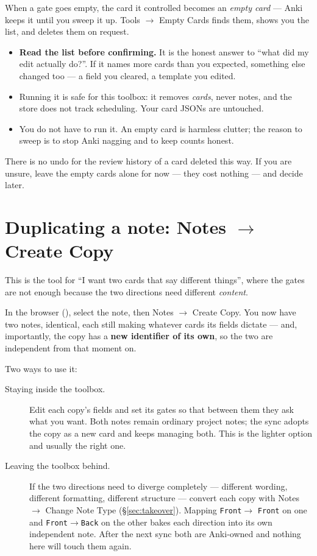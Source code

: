 \documentclass[11pt,oneside]{report}
\newcommand{\key}[1]{\textsf{\small\fbox{#1}}}
\newcommand{\menu}[1]{\textsf{#1}}
\begin{document}
When a gate goes empty, the card it controlled becomes an \emph{empty card}
--- Anki keeps it until you sweep it up. \menu{Tools $\rightarrow$ Empty
Cards} finds them, shows you the list, and deletes them on request.

\begin{itemize}
\item \textbf{Read the list before confirming.} It is the honest answer to
  ``what did my edit actually do?''. If it names more cards than you
  expected, something else changed too --- a field you cleared, a template
  you edited.
\item Running it is safe for this toolbox: it removes \emph{cards}, never
  notes, and the store does not track scheduling. Your card JSONs are
  untouched.
\item You do not have to run it. An empty card is harmless clutter; the
  reason to sweep is to stop Anki nagging and to keep counts honest.
\end{itemize}

\begin{warnbox}
There is no undo for the review history of a card deleted this way. If you
are unsure, leave the empty cards alone for now --- they cost nothing --- and
decide later.
\end{warnbox}

\section{Duplicating a note: \menu{Notes $\rightarrow$ Create Copy}}
\label{sec:createcopy}

This is the tool for ``I want two cards that say different things'', where
the gates are not enough because the two directions need different
\emph{content}.

In the browser (\key{B}), select the note, then \menu{Notes $\rightarrow$
Create Copy}. You now have two notes, identical, each still making whatever
cards its fields dictate --- and, importantly, the copy has a \textbf{new
identifier of its own}, so the two are independent from that moment on.

Two ways to use it:

\begin{description}
\item[Staying inside the toolbox.] Edit each copy's fields and set its gates
  so that between them they ask what you want. Both notes remain ordinary
  project notes; the sync adopts the copy as a new card and keeps managing
  both. This is the lighter option and usually the right one.

\item[Leaving the toolbox behind.] If the two directions need to diverge
  completely --- different wording, different formatting, different
  structure --- convert each copy with \menu{Notes $\rightarrow$ Change Note
  Type} (\S\ref{sec:takeover}). Mapping \texttt{Front}$\rightarrow$%
  \texttt{Front} on one and \texttt{Front}$\rightarrow$\texttt{Back} on the
  other bakes each direction into its own independent note. After the next
  sync both are Anki-owned and nothing here will touch them again.
\end{description}
\end{document}
